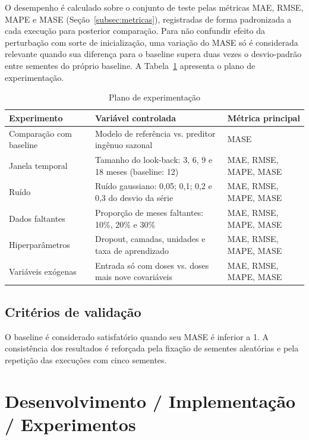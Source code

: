 \documentclass[
    12pt,
    openright,
    oneside,
    a4paper,
    english,
    brazil
]{abntex2}
\begin{document}
O desempenho é calculado sobre o conjunto de teste pelas métricas MAE, RMSE, MAPE e MASE (Seção~\ref{subsec:metricas}), registradas de forma padronizada a cada execução para posterior comparação. Para não confundir efeito da perturbação com sorte de inicialização, uma variação do MASE só é considerada relevante quando sua diferença para o baseline supera duas vezes o desvio-padrão entre sementes do próprio baseline. A Tabela~\ref{tab:plano_experimentos} apresenta o plano de experimentação.

\begin{table}[htb]
  \centering
  \caption{Plano de experimentação}
  \label{tab:plano_experimentos}
  \begin{tabular}{p{3.6cm}p{6.8cm}p{3cm}}
    \toprule
    Experimento & Variável controlada & Métrica principal \\
    \midrule
    Comparação com baseline & Modelo de referência vs. preditor ingênuo sazonal & MASE \\
    Janela temporal & Tamanho do look-back: 3, 6, 9 e 18 meses (baseline: 12) & MAE, RMSE, MAPE, MASE \\
    Ruído & Ruído gaussiano: 0,05; 0,1; 0,2 e 0,3 do desvio da série & MAE, RMSE, MAPE, MASE \\
    Dados faltantes & Proporção de meses faltantes: 10\%, 20\% e 30\% & MAE, RMSE, MAPE, MASE \\
    Hiperparâmetros & Dropout, camadas, unidades e taxa de aprendizado & MAE, RMSE, MAPE, MASE \\
    Variáveis exógenas & Entrada só com doses vs. doses mais nove covariáveis & MAE, RMSE, MAPE, MASE \\
    \bottomrule
  \end{tabular}
\end{table}

\section{Critérios de validação}

O baseline é considerado satisfatório quando seu MASE é inferior a 1. A consistência dos resultados é reforçada pela fixação de sementes aleatórias e pela repetição das execuções com cinco sementes.

\chapter{Desenvolvimento / Implementação / Experimentos}
\label{cap:desenvolvimento}
\end{document}
